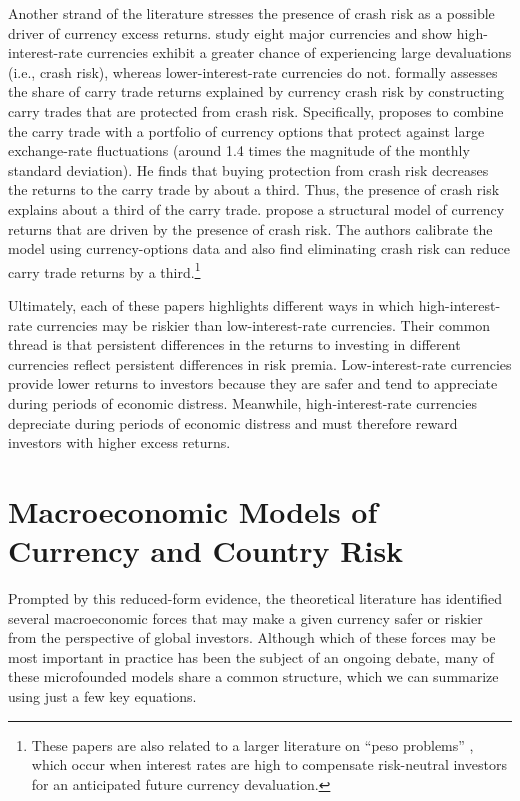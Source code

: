\documentclass{ar-1col}
\begin{document}
Another strand of the literature stresses the presence of crash risk as a possible driver of currency excess returns. \citet{Brunnermeieretal2009} study eight major currencies and show high-interest-rate currencies exhibit a greater chance of experiencing large devaluations (i.e., crash risk), whereas lower-interest-rate currencies do not. \citet{Jurek2014} formally assesses the share of carry trade returns explained by currency crash risk by constructing carry trades that are protected from crash risk. Specifically, \citet{Jurek2014} proposes to combine the carry trade with a portfolio of currency options that protect against large exchange-rate fluctuations (around 1.4 times the magnitude of the monthly standard deviation). He finds that buying protection from crash risk decreases the returns to the carry trade by about a third. Thus, the presence of crash risk explains about a third of the carry trade. \citet{Farhietal2015} propose a structural model of currency returns that are driven by the presence of crash risk. The authors calibrate the model using currency-options data and also find eliminating crash risk can reduce carry trade returns by a third.\footnote{These papers are also related to a larger literature on ``peso problems'' \citep{Lewis2011}, which occur when interest rates are high to compensate risk-neutral investors for an anticipated future currency devaluation.}

Ultimately, each of these papers highlights different ways in which high-interest-rate currencies may be riskier than low-interest-rate currencies. Their common thread is that persistent differences in the returns to investing in different currencies reflect persistent differences in risk premia. Low-interest-rate currencies provide lower returns to investors because they are safer and tend to appreciate during periods of economic distress. Meanwhile, high-interest-rate currencies depreciate during periods of economic distress and must therefore reward investors with higher excess returns.



\section{Macroeconomic Models of Currency and Country Risk\label{sec_theory}}

Prompted by this reduced-form evidence, the theoretical literature has identified several macroeconomic forces that may make a given currency safer or riskier from the perspective of global investors. Although which of these forces may be most important in practice has been the subject of an ongoing debate, many of these microfounded models share a common structure, which we can summarize using just a few key equations.
\end{document}
